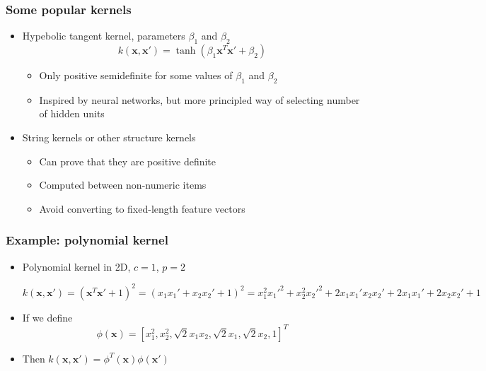 \documentclass[12pt,notes,mathserif]{beamer}
\begin{document}
\begin{frame}[c]
\frametitle{Some popular kernels}
\begin{itemize}
\item Hypebolic tangent kernel, parameters $\beta_1$ and $\beta_2$
\[
k(\mathbf{x},\mathbf{x}')=\tanh(\beta_1\mathbf{x}^T\mathbf{x}'+\beta_2)
\]
\begin{itemize}
\item Only positive semidefinite for some values of $\beta_1$ and $\beta_2$
\item Inspired by neural networks, but more principled way of selecting number of hidden units
\end{itemize}
\item String kernels or other structure kernels
\begin{itemize}
\item Can prove that they are positive definite
\item Computed between non-numeric items
\item Avoid converting to fixed-length feature vectors
\end{itemize}
\end{itemize}
\end{frame}



\begin{frame}[c]
\frametitle{Example: polynomial kernel}
\begin{itemize}
\item Polynomial kernel in 2D, $c=1$, $p=2$

$
k(\mathbf{x},\mathbf{x}')=
(\mathbf{x}^T\mathbf{x}'+1)^2=
(x_1x_1'+x_2x_2'+1)^2=
x_1^2x_1'^2+x_2^2x_2'^2+2x_1x_1'x_2x_2'+2x_1x_1'+2x_2x_2'+1
$

\item If we define
\[
\phi(\mathbf{x})=[x_1^2,x_2^2,\sqrt2x_1x_2,\sqrt2x_1,\sqrt2x_2,1]^T
\]
\item Then $k(\mathbf{x},\mathbf{x}')=\phi^T(\mathbf{x})\phi(\mathbf{x}')$
\end{itemize}
\end{frame}
\end{document}
